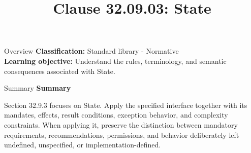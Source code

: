 \documentclass[10pt,letterpaper]{article}
\title{Clause 32.09.03: State}
\author{}
\date{}
\begin{document}
\maketitle
\begin{CornellOverviewBox}{Overview}
\textbf{Classification:} Standard library - Normative\\[2pt]
\textbf{Learning objective:} Understand the rules, terminology, and semantic consequences associated with State.
\end{CornellOverviewBox}\begin{CornellSummaryBox}{Summary}
{\sffamily\bfseries\color{Accent} Summary}\par\vspace{3pt}Section 32.9.3 focuses on State. Apply the specified interface together with its mandates, effects, result conditions, exception behavior, and complexity constraints. When applying it, preserve the distinction between mandatory requirements, recommendations, permissions, and behavior deliberately left undefined, unspecified, or implementation-defined.
\end{CornellSummaryBox}
\end{document}
